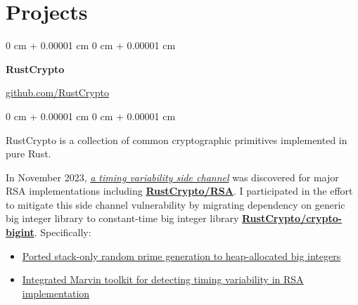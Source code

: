 \documentclass[10pt, letterpaper]{article}
\newenvironment{highlights}{
    \begin{itemize}[
        topsep=0.10 cm,
        parsep=0.10 cm,
        partopsep=0pt,
        itemsep=0pt,
        leftmargin=0 cm + 10pt
    ]
}{
    \end{itemize}
} %
\newenvironment{onecolentry}{
    \begin{adjustwidth}{
        0 cm + 0.00001 cm
    }{
        0 cm + 0.00001 cm
    }
}{
    \end{adjustwidth}
} %
\newenvironment{twocolentry}[2][]{
    \onecolentry
    \def\secondColumn{#2}
    \setcolumnwidth{\fill, 4.5 cm}
    \begin{paracol}{2}
}{
    \switchcolumn \raggedleft \secondColumn
    \end{paracol}
    \endonecolentry
} %
\begin{document}


    
    \section{Projects}
        \begin{twocolentry}
            {\href{https://github.com/RustCrypto}{github.com/RustCrypto}}
            {\textbf{RustCrypto}}
        \end{twocolentry}
        \vspace{0.1cm}
        \begin{onecolentry}
            RustCrypto is a collection of common cryptographic primitives implemented in pure Rust.
            \vspace{0.1cm}

            In November 2023, \href{https://people.redhat.com/~hkario/marvin/}{\emph{a timing variability side channel}} was discovered for major RSA implementations including \href{https://github.com/RustCrypto/RSA}{\textbf{RustCrypto/RSA}}. I participated in the effort to mitigate this side channel vulnerability by migrating dependency on generic big integer library to constant-time big integer library \href{https://github.com/RustCrypto/crypto-bigint}{\textbf{RustCrypto/crypto-bigint}}. Specifically:

            \begin{highlights}
                \item \href{https://github.com/entropyxyz/crypto-primes/pull/40}{Ported stack-only random prime generation to heap-allocated big integers}
                \item \href{https://github.com/RustCrypto/RSA/pull/400}{Integrated Marvin toolkit for detecting timing variability in RSA implementation} 
            \end{highlights}
        \end{onecolentry}
        \vspace{0.2cm}
\end{document}
